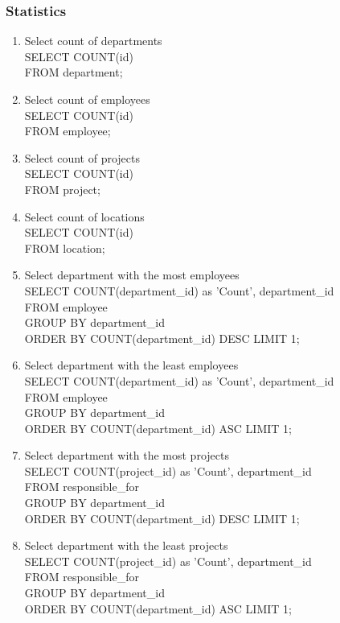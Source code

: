 \documentclass[fleqn, 11pt,letterpaper]{article}
\begin{document}
	\subsubsection{Statistics}
	\begin{enumerate}
		\item Select count of departments \\SELECT COUNT(id) \\FROM department;
		\item Select count of employees \\SELECT COUNT(id) \\FROM employee;
		\item Select count of projects \\SELECT COUNT(id) \\FROM project; 
		\item Select count of locations \\SELECT COUNT(id) \\FROM location;
		\item Select department with the most employees \\SELECT COUNT(department\_id) as 'Count', department\_id \\FROM employee \\GROUP BY department\_id \\ORDER BY COUNT(department\_id) DESC LIMIT 1;
		\item Select department with the least employees \\SELECT COUNT(department\_id) as 'Count', department\_id \\FROM employee \\GROUP BY department\_id \\ORDER BY COUNT(department\_id) ASC LIMIT 1;
	\pagebreak
		\item Select department with the most projects \\SELECT COUNT(project\_id) as 'Count', department\_id \\FROM responsible\_for \\GROUP BY department\_id \\ORDER BY COUNT(department\_id) DESC LIMIT 1;
		\item Select department with the least projects \\SELECT COUNT(project\_id) as 'Count', department\_id \\FROM responsible\_for \\GROUP BY department\_id \\ORDER BY COUNT(department\_id) ASC LIMIT 1;

\end{enumerate}
\end{document}
